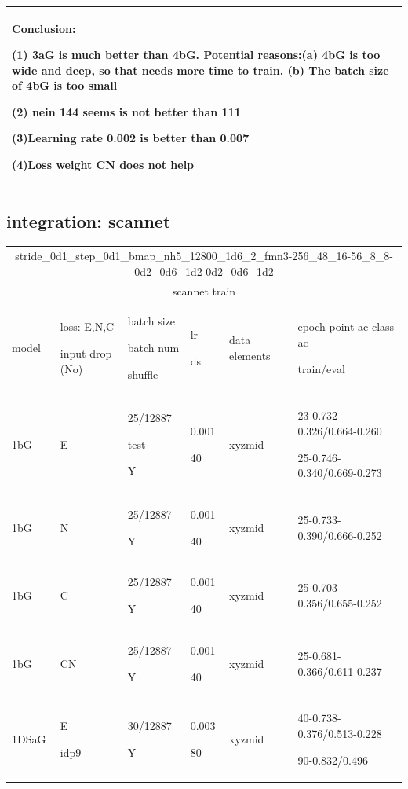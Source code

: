 \documentclass{article}
\begin{document}
\begin{tabular}{|p{1.5cm}|p{1cm}|p{1cm}|p{2cm}|p{1cm}||p{5cm}| }
	\hline\hline
	\multicolumn{6}{|p{12cm}|}{ Conclusion:\par	(1) 3aG is much better than 4bG. Potential reasons:(a) 4bG is too wide and deep, so that needs more time to train. (b) The batch size of 4bG is too small \par (2) nein 144 seems is not better than 111 \par (3)Learning rate 0.002 is better than 0.007 \par (4)Loss weight CN does not help} \\
	\hline
\end{tabular}	

\subsection{integration: scannet}
\begin{center}
	\centering {} \small
	\begin{tabular}{|p{1cm} |p{1cm} |p{1.5cm} | p{2cm} | p{2cm} || p{5cm}|} 
		\hline
		\multicolumn{6}{|c|}{stride\_0d1\_step\_0d1\_bmap\_nh5\_12800\_1d6\_2\_fmn3-256\_48\_16-56\_8\_8-0d2\_0d6\_1d2-0d2\_0d6\_1d2 }\\
		\multicolumn{6}{|c|}{ scannet train }\\
		\hline
		model & loss: E,N,C \par input drop (No) & batch size\par batch num \par shuffle& lr\par ds & data elements & epoch-point ac-class ac \par train/eval \\
		\hline
		1bG & E & 25/12887\par test \par Y & 0.001\par 40 & xyzmid & 23-0.732-0.326/0.664-0.260 \par 25-0.746-0.340/0.669-0.273\\ \hline
		1bG & N & 25/12887\par Y & 0.001\par 40 & xyzmid & 25-0.733-0.390/0.666-0.252\\ \hline
		1bG & C & 25/12887\par Y & 0.001\par 40 & xyzmid & 25-0.703-0.356/0.655-0.252\\ \hline
		1bG & CN & 25/12887\par Y & 0.001\par 40 & xyzmid & 25-0.681-0.366/0.611-0.237\\ \hline
		1DSaG & E \par idp9& 30/12887\par Y & 0.003\par 80 & xyzmid & 40-0.738-0.376/0.513-0.228 \par 90-0.832/0.496\\ \hline
		

\end{tabular}
\end{center}
\end{document}
